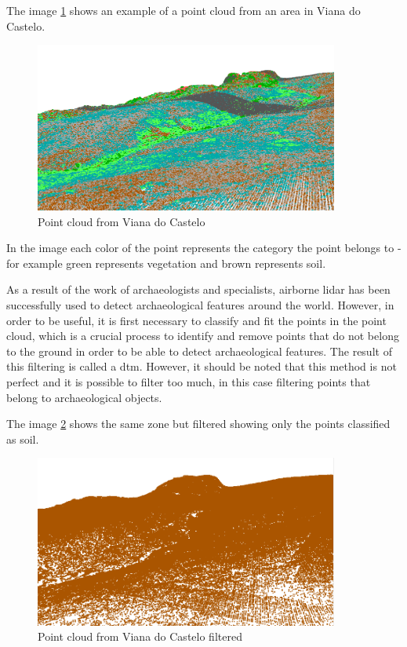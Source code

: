 The image \ref{Point cloud from Viana do Castelo} shows an example of a point cloud from an area in Viana do Castelo.

\begin{figure}[H]
\centering
\includegraphics[width=10cm]{images/pointcloudViana.png}
\caption{Point cloud from Viana do Castelo}
\label{Point cloud from Viana do Castelo}
\end{figure}

In the image each color of the point represents the category the point belongs to - for example green represents vegetation and brown represents soil.

As a result of the work of archaeologists and specialists, airborne lidar has been successfully used to detect archaeological features around the world. However, in order to be useful, it is first necessary to classify and fit the points in the point cloud, which is a crucial process to identify and remove points that do not belong to the ground in order to be able to detect archaeological features. The result of this filtering is called a \ac{dtm}. However, it should be noted that this method is not perfect and it is possible to filter too much, in this case filtering points that belong to archaeological objects.

The image \ref{Point cloud from Viana do Castelo filtered} shows the same zone but filtered showing only the points classified as soil.
\begin{figure}[H]
\centering
\includegraphics[width=10cm]{images/pointcloudVianafiltrado.png}
\caption{Point cloud from Viana do Castelo filtered}
\label{Point cloud from Viana do Castelo filtered}
\end{figure}

